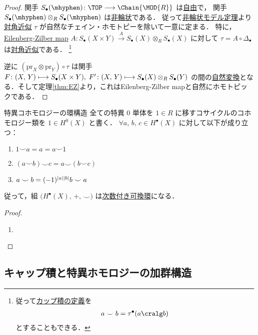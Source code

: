 \documentclass[algtopo_main]{subfiles}
\begin{document}
\begin{proof}
関手 $S_\bullet (\mhyphen)\colon \TOP \lto \Chain{\MOD{R}}$ は\hyperref[thm:AM]{自由}で，
関手 $S_\bullet (\mhyphen) \otimes_R S_\bullet (\mhyphen)$ は\hyperref[thm:AM]{非輪状}である．
従って\hyperref[thm:AM]{非輪状モデル定理}より\hyperref[def:d-approx]{対角近似} $\tau$ が自然なチェイン・ホモトピーを除いて一意に定まる．
特に，\hyperref[thm:EZ]{Eilenberg-Zilber map} $A \colon S_\bullet (X \times Y) \xrightarrow{A} S_\bullet (X) \otimes_R S_\bullet (X)$ に対して $\tau = A \circ \Delta_\bullet$ は\hyperref[def:d-approx]{対角近似}である．
\footnote{従って\hyperref[def:cup]{カップ積の定義}を
\begin{align}
    a \smile b = \tau^\bullet (a \cralg b)
\end{align}
とすることもできる．}

逆に $(\mathrm{pr}_X \otimes \mathrm{pr}_Y) \circ \tau$ は関手 $F \colon (X,\, Y) \longmapsto S_\bullet (X \times Y),\; F' \colon (X,\, Y) \longmapsto S_\bullet(X) \otimes_R S_\bullet(Y)$ の間の\hyperref[def:nat]{自然変換}となる．そして定理\ref{thm:EZ}より，これはEilenberg-Zilber mapと自然にホモトピックである．
\end{proof}

\begin{mytheo}[label=thm:ring-cohomology, breakable]{特異コホモロジーの環構造}
    全ての特異 $0$ 単体を $1 \in R$ に移すコサイクルのコホモロジー類を $1 \in H^0(X)$ と書く．
    $\forall a,\, b,\, c \in H^\bullet (X)$ に対して以下が成り立つ：
    \begin{enumerate}
        \item $1 \smile a = a = a \smile 1$
        \item $(a \smile b) \smile c = a \smile (b \smile c)$
        \item $a \smile b = (-1)^{\abs{a} \abs{b}} b \smile a$
    \end{enumerate}
    従って，組 $\bigl(H^\bullet (X),\, +,\, \smile \bigr)$ は\hyperref[def:graded-mod]{次数付き可換環}になる．
\end{mytheo}

\begin{proof}
    \begin{enumerate}
        \item 
    \end{enumerate}
    
\end{proof}

\subsection{キャップ積と特異ホモロジーの加群構造}
\end{document}
